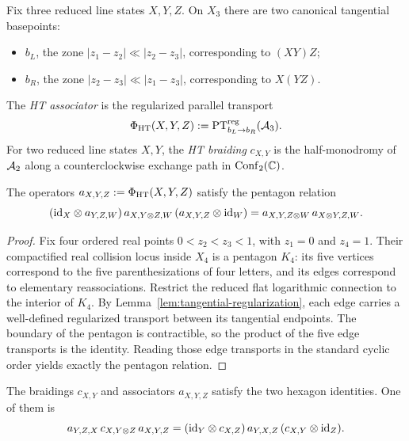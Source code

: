 Fix three reduced line states $X,Y,Z$. On $X_3$ there are two canonical tangential basepoints:
\begin{itemize}
 \item $b_L$, the zone $|z_1-z_2|\ll |z_2-z_3|$, corresponding to $(XY)Z$;
 \item $b_R$, the zone $|z_2-z_3|\ll |z_1-z_3|$, corresponding to $X(YZ)$.
\end{itemize}

\begin{definition}\label{def:ht-assoc}
The \emph{HT associator} is the regularized parallel transport
\[
 \Phi_{\mathrm{HT}}(X,Y,Z):=\mathrm{PT}^{\mathrm{reg}}_{b_L\to b_R}(\mathcal A_3).
\]
For two reduced line states $X,Y$, the \emph{HT braiding} $c_{X,Y}$ is the half-monodromy of $\mathcal A_2$ along a counterclockwise exchange path in $\mathrm{Conf}_2(\mathbb C)$.
\end{definition}

\begin{theorem}\label{thm:pentagon}
The operators $a_{X,Y,Z}:=\Phi_{\mathrm{HT}}(X,Y,Z)$ satisfy the pentagon relation
\[
 (\mathrm{id}_X\otimes a_{Y,Z,W})\,a_{X,Y\otimes Z,W}\,(a_{X,Y,Z}\otimes \mathrm{id}_W)
 =
 a_{X,Y,Z\otimes W}\,a_{X\otimes Y,Z,W}.
\]
\end{theorem}

\begin{proof}
Fix four ordered real points $0<z_2<z_3<1$, with $z_1=0$ and $z_4=1$. Their compactified real collision locus inside $X_4$ is a pentagon $K_4$: its five vertices correspond to the five parenthesizations of four letters, and its edges correspond to elementary reassociations. Restrict the reduced flat logarithmic connection to the interior of $K_4$. By Lemma~\ref{lem:tangential-regularization}, each edge carries a well-defined regularized transport between its tangential endpoints. The boundary of the pentagon is contractible, so the product of the five edge transports is the identity. Reading those edge transports in the standard cyclic order yields exactly the pentagon relation.
\end{proof}

\begin{theorem}\label{thm:hexagon}
The braidings $c_{X,Y}$ and associators $a_{X,Y,Z}$ satisfy the two hexagon identities. One of them is
\[
 a_{Y,Z,X}\,c_{X,Y\otimes Z}\,a_{X,Y,Z}
 =
 (\mathrm{id}_Y\otimes c_{X,Z})\,a_{Y,X,Z}\,(c_{X,Y}\otimes \mathrm{id}_Z).
\]
\end{theorem}

